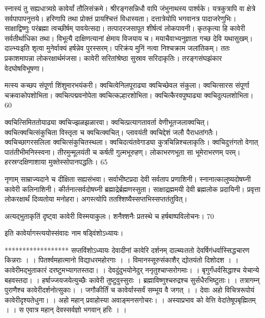 स्नास्यं तु सह्यधात्र्यग्रे कावेर्यां तौलिसंक्रमे।
श्रीरङ्गसन्निधौ वापि जंभुनाथस्य पार्श्वके।
यत्रकुत्रापि वा क्षेत्रे सर्वपापापनुत्तये।
हरिणापि तथा प्रोक्तं प्रायश्चित्तं विधास्यता।
दत्तात्रेयोपि भगवानत्र पादाजरेणुभिः।
साक्षाद्विष्णुः परंब्रह्मा त्वच्छीर्षम् पावयेत्सदा।
तत्पादरजसापूत शीर्षत्वं लोकपावनी।
कृतकृत्या हि कावेरी सर्वतीर्थाधिका तथा।
विभूत्यै दाक्षिणत्यानां क्षेमाय विजयाय च।
मयाचैवाभ्यनुज्ञाता गच्छ देवि यथासुखम्।
दाल्भ्यःइति शृत्वा मुनेर्वाक्यं हर्षन्नेव पुरस्सरम्।
परिक्रंय मुनिं नत्वा निश्चक्राम जलांतिकम्।
ततः प्रकाशमापन्ना लोकरक्षार्थमंजसा।
कावेरी सरितांश्रेष्ठा सुस्राव सरिदाकृतिः।
तरङ्गसंघझंकार वेदघोषविभूषणा।

मत्स्य कच्छप संपूर्णा शिंशुमारभयंकरी।
क्वचित्वेनिलपूराढ्या क्वचिच्छेवल संकुला।
क्वचित्सारस संपूर्णा चक्रवाकोपशोभिता।
क्वचित्पद्मवनोपेता क्वचित्कल्हारशोभिता।
क्वचित्कैरवपुष्पाढ्या क्वचिदुत्पलशोभिता।
60

क्वचित्सिमिततोयाढ्या क्वचिज्झळझळारवा।
क्वचित्प्रत्यागतावर्ता वेणीभूतजलाक्वचित्।
क्वचित्क्वचित्संकुचिता विस्तृता च क्वचित्क्वचित्।
प्लावयंती क्वचिद्देशं जलौ पैराधतांगतैः।
क्वचिच्छागरसलिला क्वचित्संकुचितस्थला।
क्वचिदत्यंतवेगाड्या कुत्रचिन्निश्चलाकृतिः।
क्वचिदुत्तंगतो वेगात् पातंतीभीमनिस्स्वना।
तीरमुन्मूलयंती च कर्षती गुल्मभूरुहण्।
लोकाभरणभूता सा भूमेराभरणम् परम्।
हरस्रग्दक्षिणाशाया मुक्तेस्सोपानपद्धतिः।
65

नृणाम् साम्राज्यदाने च दीक्षिता सह्यसंभवा।
सर्वाभीष्टप्रदा देवी सर्वताप प्रणाशिनी।
स्नानात्कालुष्यदोषघ्नी कावेरी कलिनाशिनी।
कीर्तनात्सर्वदोषघ्नी ब्रह्माद्रेर्ब्रह्मणस्सुता।
साक्षाद्रह्ममयी देवी ब्रह्मलोक प्रदायिनी।
प्रवृत्ता लोकरक्षार्थं दिव्यतोया मनोहरा।
अगस्त्योपि ततश्शिष्यैस्सप्तभिस्सप्ततंतुवित्।

अत्यद्भुताकृतिं दृष्ट्वा कावेरी विस्मयाकुलः।
शनैश्शनैः प्रतस्थे च हर्षबाष्पविलोचनः।
70

इति कावेर्यागस्त्ययोस्संवादः नाम षड्विंशोऽध्यायः।

******************
सप्तविंशोऽध्यायः
देवादीनां कावेरि दर्शनम् दाल्ब्यःततो देवर्षिगंधर्वास्सिद्धचारण किन्नराः ।
।
पितर्श्वमहात्मानो विद्याधरमहोरगाः ।
।
विमानस्सूरुसंकाशैर् द्योतयंतो दिशोदश ।
।
कावेरीमद्भुताकारं दरष्टुमभ्यागतस्तदा।
।
देवदुंदुभयोनेदुर् ननृतुश्चाप्सरोगमाः।
।
बृगुर्गंधर्वसिद्धाश्च येचान्ये बहवस्तदा।
।
हर्षाज्जयजयेत्युच्छैः कावेरी तुष्टुवुस्सुराः ।
ब्रह्माविष्णुश्चरुद्रश्च सुर्सधैरभिष्टुताः।
।
तत्रागम्न् पुराणैश्च कावेरीदर्शनोत्सुकाः।
।
जगौकीर्तिं च कावेर्यास्सर्वं सम्भूय वै जगत् ।
।
देवाः अहो विचित्ररूपोयं कावेरीदृश्यतेधुना।
।
अहो महान् प्रवाहोस्या अवाङ्मनसगोचरः।
।
अस्याप्रभाव को वेत्ति वेदांतेषूपबृह्मितम् ।
।
स एवात्र महान् देवस्सर्वज्ञो भगवान् हरिः ।
।

